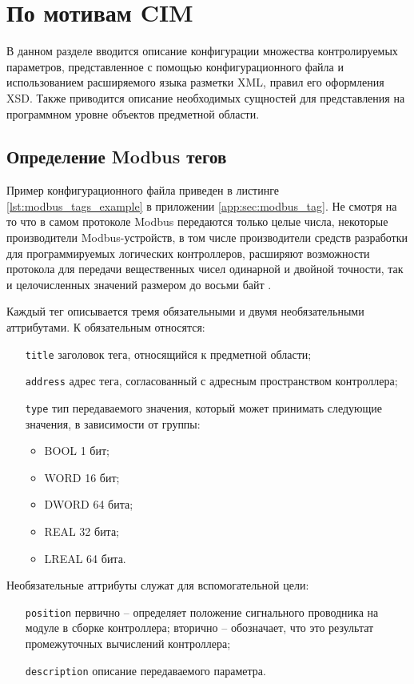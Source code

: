 \chapter{По мотивам CIM}

В данном разделе вводится описание конфигурации множества контролируемых параметров,
представленное с помощью конфигурационного файла и использованием расширяемого языка разметки XML, правил его оформления XSD.
Также приводится описание необходимых сущностей для представления
на программном уровне объектов предметной области.


\section{Определение Modbus тегов} \label{sec:modbus_tag}
Пример конфигурационного файла приведен в листинге \ref{lst:modbus_tags_example} в приложении \ref{app:sec:modbus_tag}.
Не смотря на то что в самом протоколе Modbus передаются только целые числа, некоторые производители Modbus-устройств,
в том числе производители средств разработки для программируемых логических контроллеров, расширяют возможности протокола
для передачи вещественных чисел одинарной и двойной точности, так и целочисленных значений размером до восьми байт \cite{book:gost:modbus_program_language}.

Каждый тег описывается тремя обязательными и двумя необязательными аттрибутами.
К обязательным относятся:
\begin{itemize}
    \item[\texttt{title}] заголовок тега, относящийся к предметной области;
    \item[\texttt{address}] адрес тега, согласованный с адресным пространством контроллера;
    \item[\texttt{type}] тип передаваемого значения, который может принимать следующие значения, в зависимости от группы:
    \begin{itemize}
        \item BOOL 1 бит;
        \item WORD 16 бит;
        \item DWORD 64 бита;
        \item REAL 32 бита;
        \item LREAL 64 бита.
    \end{itemize}
\end{itemize}
Необязательные аттрибуты служат для вспомогательной цели:
\begin{itemize}
    \item[\texttt{position}] первично -- определяет положение сигнального проводника на модуле в сборке контроллера;
    вторично -- обозначает, что это результат промежуточных вычислений контроллера;
    \item[\texttt{description}] описание передаваемого параметра.
\end{itemize}



